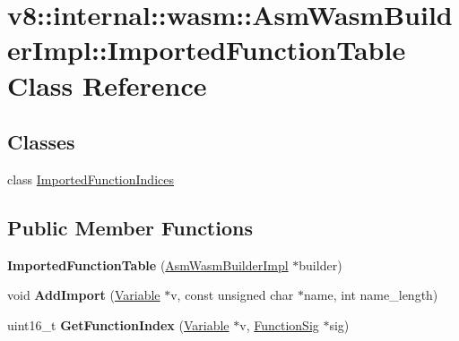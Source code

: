 \hypertarget{classv8_1_1internal_1_1wasm_1_1_asm_wasm_builder_impl_1_1_imported_function_table}{}\section{v8\+:\+:internal\+:\+:wasm\+:\+:Asm\+Wasm\+Builder\+Impl\+:\+:Imported\+Function\+Table Class Reference}
\label{classv8_1_1internal_1_1wasm_1_1_asm_wasm_builder_impl_1_1_imported_function_table}
\subsection*{Classes}
\begin{DoxyCompactItemize}
\item 
class \hyperlink{classv8_1_1internal_1_1wasm_1_1_asm_wasm_builder_impl_1_1_imported_function_table_1_1_imported_function_indices}{Imported\+Function\+Indices}
\end{DoxyCompactItemize}
\subsection*{Public Member Functions}
\begin{DoxyCompactItemize}
\item 
{\bfseries Imported\+Function\+Table} (\hyperlink{classv8_1_1internal_1_1wasm_1_1_asm_wasm_builder_impl}{Asm\+Wasm\+Builder\+Impl} $\ast$builder)\hypertarget{classv8_1_1internal_1_1wasm_1_1_asm_wasm_builder_impl_1_1_imported_function_table_ae598a65b65110ccae82aa1b06ef02b4c}{}\label{classv8_1_1internal_1_1wasm_1_1_asm_wasm_builder_impl_1_1_imported_function_table_ae598a65b65110ccae82aa1b06ef02b4c}

\item 
void {\bfseries Add\+Import} (\hyperlink{classv8_1_1internal_1_1_variable}{Variable} $\ast$v, const unsigned char $\ast$name, int name\+\_\+length)\hypertarget{classv8_1_1internal_1_1wasm_1_1_asm_wasm_builder_impl_1_1_imported_function_table_ad2128aacdc2d0259432039195099df2c}{}\label{classv8_1_1internal_1_1wasm_1_1_asm_wasm_builder_impl_1_1_imported_function_table_ad2128aacdc2d0259432039195099df2c}

\item 
uint16\+\_\+t {\bfseries Get\+Function\+Index} (\hyperlink{classv8_1_1internal_1_1_variable}{Variable} $\ast$v, \hyperlink{classv8_1_1internal_1_1_signature}{Function\+Sig} $\ast$sig)\hypertarget{classv8_1_1internal_1_1wasm_1_1_asm_wasm_builder_impl_1_1_imported_function_table_a76c49694de628fc4d602c2ba71bdbbc9}{}\label{classv8_1_1internal_1_1wasm_1_1_asm_wasm_builder_impl_1_1_imported_function_table_a76c49694de628fc4d602c2ba71bdbbc9}

\end{DoxyCompactItemize}
